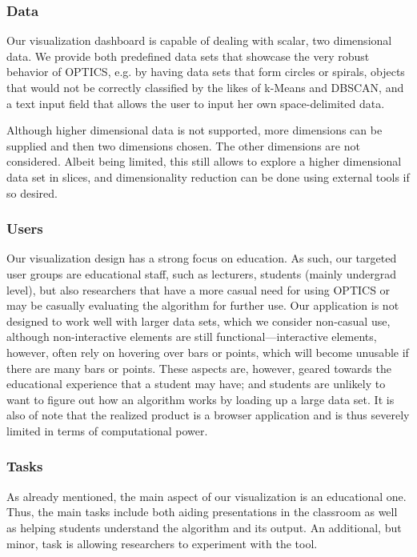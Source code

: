 \documentclass{vgtc} %
\begin{document}
\subsubsection{Data}

Our visualization dashboard is capable of dealing with scalar, two dimensional
data. We provide both predefined data sets that showcase the very robust
behavior of OPTICS, e.g. by having data sets that form circles or spirals,
objects that would not be correctly classified by the likes of k-Means and
DBSCAN, and a text input field that allows the user to input her own
space-delimited data.

Although higher dimensional data is not supported, more dimensions can be
supplied and then two dimensions chosen. The other dimensions are not
considered. Albeit being limited, this still allows to explore a higher
dimensional data set in slices, and dimensionality reduction can be done
using external tools if so desired.


\subsubsection{Users}

Our visualization design has a strong focus on education. As such, our targeted
user groups are educational staff, such as lecturers, students (mainly
undergrad level), but also researchers that have a more casual need for using
OPTICS or may be casually evaluating the algorithm for further use. Our
application is not designed to work well with larger data sets, which we
consider non-casual use, although non-interactive elements are still
functional---interactive elements, however, often rely on hovering over bars or
points, which will become unusable if there are many bars or points. These
aspects are, however, geared towards the educational experience that a student
may have; and students are unlikely to want to figure out how an algorithm
works by loading up a large data set. It is also of note that the realized
product is a browser application and is thus severely limited in terms of
computational power.


\subsubsection{Tasks}

As already mentioned, the main aspect of our visualization is an educational one.
Thus, the main tasks include both aiding presentations in the classroom as well as
helping students understand the algorithm and its output. An additional, but minor,
task is allowing researchers to experiment with the tool.
\end{document}
